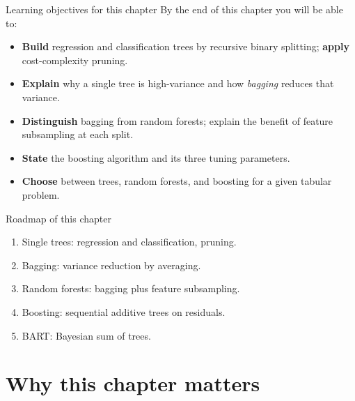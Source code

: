 \documentclass[aspectratio=169,11pt]{beamer}
\begin{document}
\begin{frame}{Learning objectives for this chapter}
  By the end of this chapter you will be able to:
  \begin{itemize}
    \item \textbf{Build} regression and classification trees by
          recursive binary splitting; \textbf{apply} cost-complexity
          pruning.
    \item \textbf{Explain} why a single tree is high-variance and how
          \emph{bagging} reduces that variance.
    \item \textbf{Distinguish} bagging from random forests; explain
          the benefit of feature subsampling at each split.
    \item \textbf{State} the boosting algorithm and its three tuning
          parameters.
    \item \textbf{Choose} between trees, random forests, and boosting
          for a given tabular problem.
  \end{itemize}
\end{frame}


\begin{frame}{Roadmap of this chapter}
  \begin{takeaway}
    \begin{enumerate}
      \item Single trees: regression and classification, pruning.
      \item Bagging: variance reduction by averaging.
      \item Random forests: bagging plus feature subsampling.
      \item Boosting: sequential additive trees on residuals.
      \item BART: Bayesian sum of trees.
    \end{enumerate}
  \end{takeaway}
\end{frame}

\section{Why this chapter matters}
\end{document}
